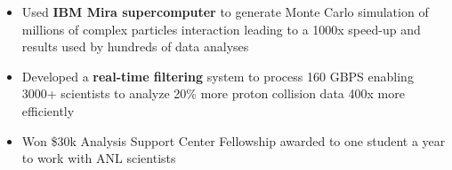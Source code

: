 \documentclass{myfancycv}
\begin{document}
\begin{itemize}
\vspace*{-0.5em}
{
{\begin{itemize}\setlength\itemindent{-2.2em}
\item Used {\bf IBM Mira supercomputer} to generate Monte Carlo simulation of millions of complex particles interaction leading to a 1000x speed-up and results used by hundreds of data analyses
\item Developed a {\bf real-time filtering} system to process 160 GBPS enabling 3000+ scientists to analyze 20\% more proton collision data 400x more efficiently
\item Won \$30k Analysis Support Center Fellowship awarded to one student a year to work with ANL scientists
\end{itemize}}%
}

\end{itemize}

\end{document}
